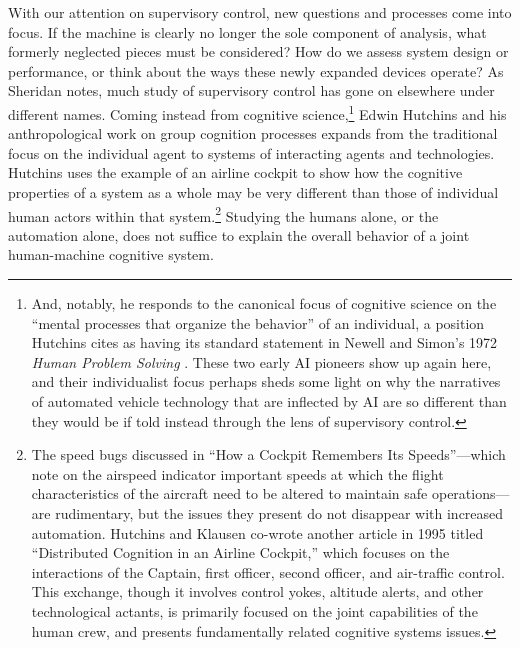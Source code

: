 With our attention on supervisory control, new questions and processes
come into focus. If the machine is clearly no
longer the sole component of analysis, what formerly neglected pieces
must be considered? How do we assess system design or performance, or
think about the ways these newly expanded devices operate? As Sheridan notes, much study of
supervisory control has gone on elsewhere under different names. Coming instead from cognitive
science,\footnote{And, notably, he responds to the canonical focus of
  cognitive science on the ``mental processes that organize the
  behavior'' of an individual, a position Hutchins cites as having its
standard statement in Newell and Simon's 1972 \emph{Human Problem
  Solving} \cite[p. 265-266]{hutchinsCockpit}. These two early AI pioneers show
up again here, and their individualist focus perhaps sheds some 
light on why the narratives of automated vehicle technology that are
inflected by AI are so different than they would be if told instead
through the lens of supervisory control.}
Edwin Hutchins and his anthropological work on group cognition
processes expands from the traditional focus on the individual agent
to systems of interacting agents and technologies.
Hutchins uses the example of an airline cockpit \cite{hutchinsCockpit} to show how the cognitive
properties of a system as a whole may be very different than those of
individual human actors within that system.\footnote{The speed bugs discussed in ``How a Cockpit
Remembers Its Speeds''---which note on the airspeed indicator
important speeds at which the 
flight characteristics of the aircraft need to be altered to maintain
safe operations---are rudimentary, but the issues they present do not disappear with
increased automation. Hutchins and Klausen co-wrote another
article in 1995 titled ``Distributed Cognition in an Airline
Cockpit,'' \cite{hutchinsKlausen} which focuses on the
interactions of the Captain, first 
officer, second officer, and air-traffic control. This exchange,
though it involves control yokes, altitude alerts, and other
technological actants, is primarily focused on the joint capabilities
of the human crew, and presents fundamentally related cognitive
systems issues.} Studying the humans alone,
or the automation alone, does not suffice to explain the overall
behavior of a joint human-machine cognitive system.


